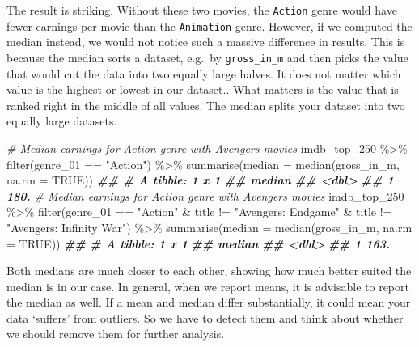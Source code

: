 \documentclass[
]{book}
\newenvironment{Shaded}{\begin{snugshade}}{\end{snugshade}}
\newcommand{\AttributeTok}[1]{\textcolor[rgb]{0.77,0.63,0.00}{#1}}
\newcommand{\CommentTok}[1]{\textcolor[rgb]{0.56,0.35,0.01}{\textit{#1}}}
\newcommand{\ConstantTok}[1]{\textcolor[rgb]{0.00,0.00,0.00}{#1}}
\newcommand{\DocumentationTok}[1]{\textcolor[rgb]{0.56,0.35,0.01}{\textbf{\textit{#1}}}}
\newcommand{\FunctionTok}[1]{\textcolor[rgb]{0.00,0.00,0.00}{#1}}
\newcommand{\NormalTok}[1]{#1}
\newcommand{\SpecialCharTok}[1]{\textcolor[rgb]{0.00,0.00,0.00}{#1}}
\newcommand{\StringTok}[1]{\textcolor[rgb]{0.31,0.60,0.02}{#1}}
\begin{document}
The result is striking. Without these two movies, the \texttt{Action} genre would have fewer earnings per movie than the \texttt{Animation} genre. However, if we computed the median instead, we would not notice such a massive difference in results. This is because the median sorts a dataset, e.g.~by \texttt{gross\_in\_m} and then picks the value that would cut the data into two equally large halves. It does not matter which value is the highest or lowest in our dataset.. What matters is the value that is ranked right in the middle of all values. The median splits your dataset into two equally large datasets.

\begin{Shaded}
\begin{Highlighting}[]
\CommentTok{\# Median earnings for Action genre with Avengers movies}
\NormalTok{imdb\_top\_250 }\SpecialCharTok{\%\textgreater{}\%} 
  \FunctionTok{filter}\NormalTok{(genre\_01 }\SpecialCharTok{==} \StringTok{"Action"}\NormalTok{) }\SpecialCharTok{\%\textgreater{}\%} 
  \FunctionTok{summarise}\NormalTok{(}\AttributeTok{median =} \FunctionTok{median}\NormalTok{(gross\_in\_m, }\AttributeTok{na.rm =} \ConstantTok{TRUE}\NormalTok{))}
\DocumentationTok{\#\# \# A tibble: 1 x 1}
\DocumentationTok{\#\#   median}
\DocumentationTok{\#\#    \textless{}dbl\textgreater{}}
\DocumentationTok{\#\# 1   180.}
\CommentTok{\# Median earnings for Action genre with Avengers movies}
\NormalTok{imdb\_top\_250 }\SpecialCharTok{\%\textgreater{}\%} 
  \FunctionTok{filter}\NormalTok{(genre\_01 }\SpecialCharTok{==} \StringTok{"Action"} \SpecialCharTok{\&}
\NormalTok{           title }\SpecialCharTok{!=} \StringTok{"Avengers: Endgame"} \SpecialCharTok{\&}
\NormalTok{           title }\SpecialCharTok{!=} \StringTok{"Avengers: Infinity War"}\NormalTok{) }\SpecialCharTok{\%\textgreater{}\%} 
  \FunctionTok{summarise}\NormalTok{(}\AttributeTok{median =} \FunctionTok{median}\NormalTok{(gross\_in\_m, }\AttributeTok{na.rm =} \ConstantTok{TRUE}\NormalTok{))}
\DocumentationTok{\#\# \# A tibble: 1 x 1}
\DocumentationTok{\#\#   median}
\DocumentationTok{\#\#    \textless{}dbl\textgreater{}}
\DocumentationTok{\#\# 1   163.}
\end{Highlighting}
\end{Shaded}

Both medians are much closer to each other, showing how much better suited the median is in our case. In general, when we report means, it is advisable to report the median as well. If a mean and median differ substantially, it could mean your data `suffers' from outliers. So we have to detect them and think about whether we should remove them for further analysis.
\end{document}
